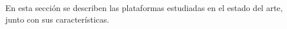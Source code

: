 
En esta sección se describen las plataformas estudiadas en el estado del arte,
junto con sus características.
